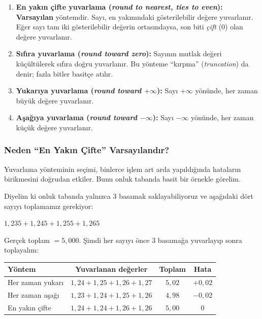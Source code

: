 \begin{enumerate}
\item \textbf{En yakın çifte yuvarlama (\emph{round to nearest, ties to even}):} \textbf{Varsayılan} yöntemdir. Sayı, en yakınındaki gösterilebilir değere yuvarlanır. Eğer sayı tam iki gösterilebilir değerin ortasındaysa, son biti \emph{çift} (0) olan değere yuvarlanır.

\item \textbf{Sıfıra yuvarlama (\emph{round toward zero}):} Sayının mutlak değeri küçültülerek sıfıra doğru yuvarlanır. Bu yönteme ``kırpma'' (\emph{truncation}) da denir; fazla bitler basitçe atılır.

\item \textbf{Yukarıya yuvarlama (\emph{round toward $+\infty$}):} Sayı $+\infty$ yönünde, her zaman büyük değere yuvarlanır.

\item \textbf{Aşağıya yuvarlama (\emph{round toward $-\infty$}):} Sayı $-\infty$ yönünde, her zaman küçük değere yuvarlanır.
\end{enumerate}

\subsubsection{Neden ``En Yakın Çifte'' Varsayılandır?}

Yuvarlama yönteminin seçimi, binlerce işlem art arda yapıldığında hataların birikmesini doğrudan etkiler. Bunu onluk tabanda basit bir örnekle görelim.

Diyelim ki onluk tabanda yalnızca 3 basamak saklayabiliyoruz ve aşağıdaki dört sayıyı toplamamız gerekiyor:

\begin{center}
$1{,}235 + 1{,}245 + 1{,}255 + 1{,}265$
\end{center}

Gerçek toplam $= 5{,}000$. Şimdi her sayıyı önce 3 basamağa yuvarlayıp sonra toplayalım:

\begin{center}
\small
\begin{tabular}{l c c c}
\toprule
\textbf{Yöntem} & \textbf{Yuvarlanan değerler} & \textbf{Toplam} & \textbf{Hata} \\
\midrule
Her zaman yukarı & $1{,}24 + 1{,}25 + 1{,}26 + 1{,}27$ & $5{,}02$ & $+0{,}02$ \\
Her zaman aşağı & $1{,}23 + 1{,}24 + 1{,}25 + 1{,}26$ & $4{,}98$ & $-0{,}02$ \\
En yakın çifte & $1{,}24 + 1{,}24 + 1{,}26 + 1{,}26$ & $5{,}00$ & $0$ \\
\bottomrule
\end{tabular}
\end{center}

